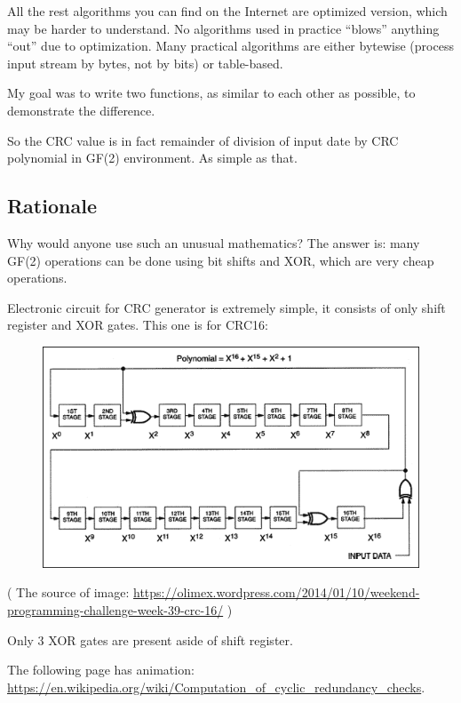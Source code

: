 All the rest algorithms you can find on the Internet are optimized version, which may be harder to understand.
No algorithms used in practice ``blows'' anything ``out'' due to optimization.
Many practical algorithms are either bytewise (process input stream by bytes, not by bits) or table-based.

My goal was to write two functions, as similar to each other as possible, to demonstrate the difference.

So the CRC value is in fact remainder of division of input date by CRC polynomial in GF(2) environment.
As simple as that.

\subsection{Rationale}

Why would anyone use such an unusual mathematics?
The answer is: many GF(2) operations can be done using bit shifts and XOR, which are very cheap operations.

Electronic circuit for CRC generator is extremely simple, it consists of only shift register and XOR gates.
This one is for CRC16:

\begin{figure}[H]
\centering
\includegraphics[scale=1]{CRC/explanation/CRC16.png}
\caption{}
\end{figure}

( The source of image: \url{https://olimex.wordpress.com/2014/01/10/weekend-programming-challenge-week-39-crc-16/} )

Only 3 XOR gates are present aside of shift register.

The following page has animation: \url{https://en.wikipedia.org/wiki/Computation_of_cyclic_redundancy_checks}.

